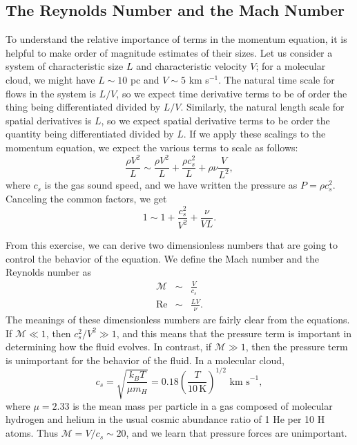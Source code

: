 \subsection{The Reynolds Number and the Mach Number}
\label{ssec:reynolds_mach}

To understand the relative importance of terms in the momentum equation, it is helpful to make order of magnitude estimates of their sizes. Let us consider a system of characteristic size $L$ and characteristic velocity $V$; for a molecular cloud, we might have $L\sim 10$ pc and $V\sim 5$ km s$^{-1}$. The natural time scale for flows in the system is $L/V$, so we expect time derivative terms to be of order the thing being differentiated divided by $L/V$. Similarly, the natural length scale for spatial derivatives is $L$, so we expect spatial derivative terms to be order the quantity being differentiated divided by $L$. If we apply these scalings to the momentum equation, we expect the various terms to scale as follows:
\begin{equation}
\frac{\rho V^2}{L} \sim \frac{\rho V^2}{L} + \frac{\rho c_s^2}{L} + \rho \nu \frac{V}{L^2},
\end{equation}
where $c_s$ is the gas sound speed, and we have written the pressure as $P = \rho c_s^2$. Canceling the common factors, we get
\begin{equation}
1 \sim 1 + \frac{c_s^2}{V^2} + \frac{\nu}{VL}.
\end{equation}

From this exercise, we can derive two dimensionless numbers that are going to control the behavior of the equation. We define the Mach number and the Reynolds number as
\begin{eqnarray}
\mathcal{M} & \sim & \frac{V}{c_s} \\
\mathrm{Re} & \sim & \frac{LV}{\nu}.
\end{eqnarray}
The meanings of these dimensionless numbers are fairly clear from the equations. If $\mathcal{M} \ll 1$, then $c_s^2/V^2 \gg 1$, and this means that the pressure term is important in determining how the fluid evolves. In contrast, if $\mathcal{M} \gg 1$, then the pressure term is unimportant for the behavior of the fluid. In a molecular cloud,
\begin{equation}
c_s  =\sqrt{\frac{k_B T}{\mu m_H}} = 0.18 \left(\frac{T}{10\,\mathrm{K}}\right)^{1/2}\mbox{ km s}^{-1},
\end{equation}
where $\mu =2.33$ is the mean mass per particle in a gas composed of molecular hydrogen and helium in the usual cosmic abundance ratio of 1 He per 10 H atoms. Thus $\mathcal{M} = V/c_s \sim 20$, and we learn that pressure forces are unimportant.

